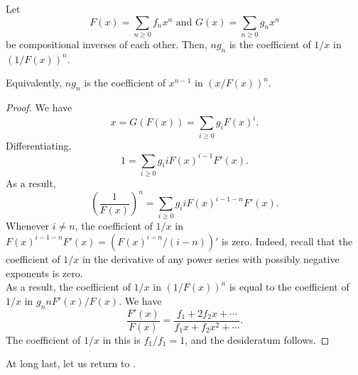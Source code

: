 	\begin{ftheo}
		\label{theo: lagrange inversion}
		Let
		\[ F(x) = \sum_{n \ge 0} f_n x^n \text{ and } G(x) = \sum_{n \ge 0} g_n x^n \]
		be compositional inverses of each other. Then, $ng_n$ is the coefficient of $1/x$ in $(1/F(x))^n$.
	\end{ftheo}
	Equivalently, $ng_n$ is the coefficient of $x^{n-1}$ in $(x/F(x))^n$.
	\begin{proof}
		We have
		\[ x = G(F(x)) = \sum_{i \ge 0} g_i F(x)^i. \]
		Differentiating,
		\[ 1 = \sum_{i \ge 0} g_i i F(x)^{i-1} F'(x). \]
		As a result,
		\[ \left(\frac{1}{F(x)}\right)^n = \sum_{i \ge 0} g_i i F(x)^{i-1-n} F'(x).  \]
		Whenever $i \ne n$, the coefficient of $1/x$ in $F(x)^{i-1-n} F'(x) = \left(F(x)^{i-n}/(i-n)\right)'$ is zero. Indeed, recall that the coefficient of $1/x$ in the derivative of any power series with possibly negative exponents is zero.\\
		As a result, the coefficient of $1/x$ in $(1/F(x))^n$ is equal to the coefficient of $1/x$ in $g_n n F'(x) / F(x)$.
		We have
		\[ \frac{F'(x)}{F(x)} = \frac{f_1 + 2f_2x + \cdots}{f_1x + f_2x^2 + \cdots}. \]
		The coefficient of $1/x$ in this is $f_1/f_1 = 1$, and the desideratum follows. 
	\end{proof}

	At long last, let us return to .

